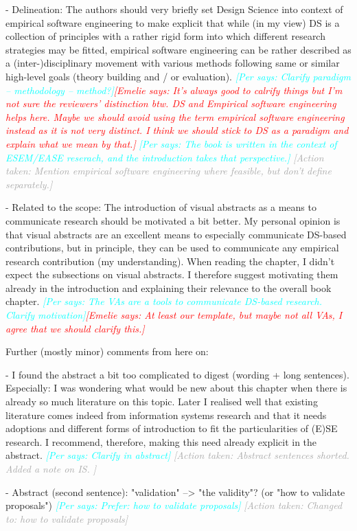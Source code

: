 \documentclass{article}
\newcommand{\emelie}[1]{\textcolor{red}{{\it [Emelie says: #1]}}}
\newcommand{\per}[1]{\textcolor{cyan}{{\it [Per says: #1]}}}
\newcommand{\action}[1]{\textcolor{darkgray}{{\it [Action taken: #1]}}}
\newcommand{\emelie}[1]{}
\newcommand{\per}[1]{}
\newcommand{\action}[1]{}
\begin{document}
- Delineation: The authors should very briefly set Design Science into context of empirical software engineering to make explicit that while (in my view) DS is a collection of principles with a rather rigid form into which different research strategies may be fitted, empirical software engineering can be rather described as a (inter-)disciplinary movement with various methods following same or similar high-level goals (theory building and / or evaluation). \per{Clarify paradigm -- methodology -- method?}\emelie{It's always good to calrify things but I'm not sure the reviewers' distinction btw. DS and Empirical software engineering helps here. Maybe we should avoid using the term empirical software engineering instead as it is not very distinct. I think we should stick to DS as a paradigm and explain what we mean by that.} \per{The book is written in the context of ESEM/EASE reserach, and the introduction takes that perspective.} \action{Mention empirical software engineering where feasible, but don't define separately.}

- Related to the scope: The introduction of visual abstracts as a means to communicate research should be motivated a bit better. My personal opinion is that visual abstracts are an excellent means to especially communicate DS-based contributions, but in principle, they can be used to communicate any empirical research contribution (my understanding). When reading the chapter, I didn't expect the subsections on visual abstracts. I therefore suggest motivating them already in the introduction and explaining their relevance to the overall book chapter. \per{The VAs are a tools to communicate DS-based research. Clarify motivation}\emelie{At least our template, but maybe not all VAs, I agree that we should clarify this.}


Further (mostly minor) comments from here on:

- I found the abstract a bit too complicated to digest (wording + long sentences). Especially: I was wondering what would be new about this chapter when there is already so much literature on this topic. Later I realised well that existing literature comes indeed from information systems research and that it needs adoptions and different forms of introduction to fit the particularities of (E)SE research. I recommend, therefore, making this need already explicit in the abstract. \per{Clarify in abstract} \action{Abstract sentences shorted. Added a note on IS. }

- Abstract (second sentence): "validation" --> "the validity"? (or "how to validate proposals") \per{Prefer: how to validate proposals} \action{Changed to: how to validate proposals}
\end{document}
